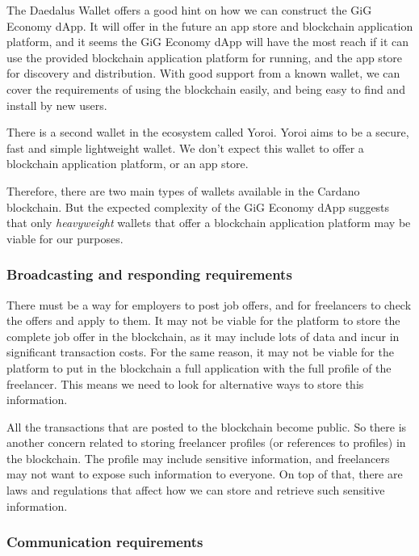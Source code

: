 \documentclass{article}
\begin{document}
The Daedalus Wallet offers a good hint on how we can construct the GiG Economy dApp. It will offer in the future an app store and blockchain application platform, and it seems the GiG Economy dApp will have the most reach if it can use the provided blockchain application platform for running, and the app store for discovery and distribution. With good support from a known wallet, we can cover the requirements of using the blockchain easily, and being easy to find and install by new users.

There is a second wallet in the ecosystem called Yoroi. Yoroi aims to be a secure, fast and simple lightweight wallet\cite{yoroi-website}. We don't expect this wallet to offer a blockchain application platform, or an app store.

Therefore, there are two main types of wallets available in the Cardano blockchain. But the expected complexity of the GiG Economy dApp suggests that only \emph{heavyweight} wallets that offer a blockchain application platform may be viable for our purposes.

\subsubsection{Broadcasting and responding requirements}

There must be a way for employers to post job offers, and for freelancers to check the offers and apply to them. It may not be viable for the platform to store the complete job offer in the blockchain, as it may include lots of data and incur in significant transaction costs. For the same reason, it may not be viable for the platform to put in the blockchain a full application with the full profile of the freelancer. This means we need to look for alternative ways to store this information.

All the transactions that are posted to the blockchain become public. So there is another concern related to storing freelancer profiles (or references to profiles) in the blockchain. The profile may include sensitive information, and freelancers may not want to expose such information to everyone. On top of that, there are laws and regulations that affect how we can store and retrieve such sensitive information.

\subsubsection{Communication requirements}
\end{document}
